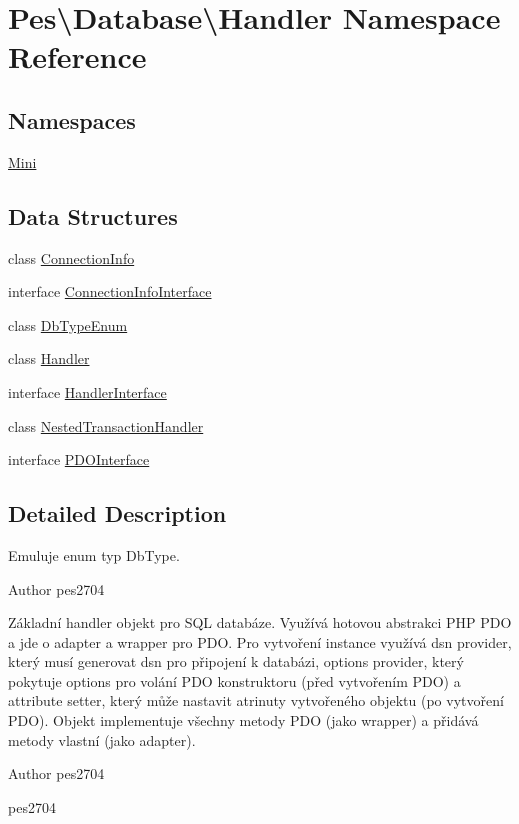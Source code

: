 \hypertarget{namespace_pes_1_1_database_1_1_handler}{}\section{Pes\textbackslash{}Database\textbackslash{}Handler Namespace Reference}
\label{namespace_pes_1_1_database_1_1_handler}
\subsection*{Namespaces}
\begin{DoxyCompactItemize}
\item 
 \mbox{\hyperlink{namespace_pes_1_1_database_1_1_handler_1_1_mini}{Mini}}
\end{DoxyCompactItemize}
\subsection*{Data Structures}
\begin{DoxyCompactItemize}
\item 
class \mbox{\hyperlink{class_pes_1_1_database_1_1_handler_1_1_connection_info}{Connection\+Info}}
\item 
interface \mbox{\hyperlink{interface_pes_1_1_database_1_1_handler_1_1_connection_info_interface}{Connection\+Info\+Interface}}
\item 
class \mbox{\hyperlink{class_pes_1_1_database_1_1_handler_1_1_db_type_enum}{Db\+Type\+Enum}}
\item 
class \mbox{\hyperlink{class_pes_1_1_database_1_1_handler_1_1_handler}{Handler}}
\item 
interface \mbox{\hyperlink{interface_pes_1_1_database_1_1_handler_1_1_handler_interface}{Handler\+Interface}}
\item 
class \mbox{\hyperlink{class_pes_1_1_database_1_1_handler_1_1_nested_transaction_handler}{Nested\+Transaction\+Handler}}
\item 
interface \mbox{\hyperlink{interface_pes_1_1_database_1_1_handler_1_1_p_d_o_interface}{P\+D\+O\+Interface}}
\end{DoxyCompactItemize}


\subsection{Detailed Description}
Emuluje enum typ Db\+Type.

\begin{DoxyAuthor}{Author}
pes2704
\end{DoxyAuthor}
Základní handler objekt pro S\+QL databáze. Využívá hotovou abstrakci P\+HP P\+DO a jde o adapter a wrapper pro P\+DO. Pro vytvoření instance využívá dsn provider, který musí generovat dsn pro připojení k databázi, options provider, který pokytuje options pro volání P\+DO konstruktoru (před vytvořením P\+DO) a attribute setter, který může nastavit atrinuty vytvořeného objektu (po vytvoření P\+DO). Objekt implementuje všechny metody P\+DO (jako wrapper) a přidává metody vlastní (jako adapter).

\begin{DoxyAuthor}{Author}
pes2704

pes2704 
\end{DoxyAuthor}

